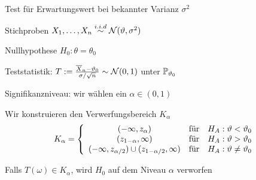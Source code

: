 \begin{definition}[z-Test] Test für Erwartungswert bei bekannter Varianz \(\sigma^2\)

	\begin{compactenum}
		\item Stichproben \(X_1, \ldots, X_n \iid \Stdev(\theta,\sigma^2)\)
		\item Nullhypothese \(H_0: \theta = \theta_0\)
		\item Teststatistik: \( T := \frac{\overline{X}_n - \theta_0}{\sigma / \sqrt{n}} \sim \Stdev(0,1)\) unter \(\P_{\theta_0}\)
		\item Signifikanzniveau: wir wählen ein \(\alpha \in (0,1)\)
		\item Wir konstruieren den Verwerfungsbereich \(K_\alpha\)
		\[
			K_\alpha =	\left\{\begin{array}{cl}
				(-\infty, z_{\alpha})                                 & \text{für\quad} H_A: \theta < \theta_0    \\
				(z_{1-\alpha}, \infty)                                & \text{für\quad} H_A: \theta > \theta_0    \\
				(-\infty, z_{\alpha/2}) \cup (z_{1-\alpha/2}, \infty) & \text{für\quad} H_A: \theta \neq \theta_0
			\end{array}\right.
		\]
		\item Falls \(T(\omega) \in K_\alpha\), wird \(H_0\) auf dem Niveau \(\alpha\) verworfen
	\end{compactenum}
\end{definition}




